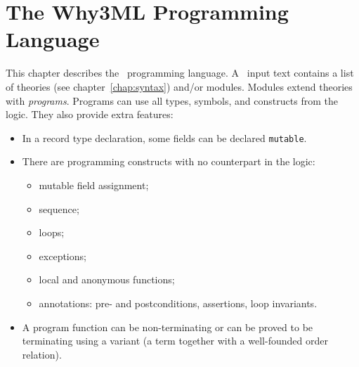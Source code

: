 \chapter{The Why3ML Programming Language}
\label{chap:whyml}

This chapter describes the \whyml\ programming language.
A \whyml\ input text contains a list of theories (see
chapter~\ref{chap:syntax}) and/or modules.
Modules extend theories with \emph{programs}.
Programs can use all types, symbols, and constructs from the logic.
They also provide extra features:
\begin{itemize}
\item In a record type declaration, some fields can be declared
  \texttt{mutable}.
\item There are programming constructs with no counterpart in the logic:
  \begin{itemize}
  \item mutable field assignment;
  \item sequence;
  \item loops;
  \item exceptions;
  \item local and anonymous functions;
  \item annotations: pre- and postconditions, assertions, loop invariants.
  \end{itemize}
\item A program function can be non-terminating or can be proved
  to be terminating using a variant (a term together with a well-founded
  order relation).
\end{itemize}


